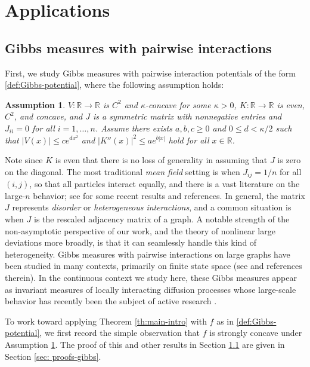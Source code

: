 \documentclass[11pt,reqno]{amsart}
\numberwithin{equation}{section}
\newtheorem{assumption}[theorem]{Assumption}
\theoremstyle{definition}
\def\R{{\mathbb R}}
\begin{document}
\section{Applications} \label{se:applications}

\subsection{Gibbs measures with pairwise interactions} \label{se:Gibbs}


First, we study Gibbs measures  with pairwise interaction potentials  of the form \eqref{def:Gibbs-potential},
	where the following assumption holds:
	\begin{assumption} \label{ass:Gibbs}
		$V : \R \to \R$ is $C^2$ and $\kappa$-concave for some $ \kappa > 0$, $K : \R \to \R$ is even, $C^2$, and concave, and $J$ is a symmetric matrix with nonnegative entries and $J_{ii}=0$ for all $i=1,\ldots,n$. Assume there exists $ a,b,c \ge 0 $ and $0 \le d  < \kappa/2$  such that $ |V(x)| \le  c e^{d x^2} $ and $|K''(x)|^2 \le ae^{b|x|}$  hold for all $ x \in \R $.
	\end{assumption}
	Note since $K$ is even that there is no loss of generality in assuming that $J$ is zero on the diagonal.
	The most traditional \emph{mean field} setting is when $J_{ij}=1/n$ for all $(i,j)$, so that all particles interact equally, and there is a vast literature on the large-$n$ behavior; see \cite{chafai2014first,dupuis2020large} for some recent results and references.
	In general, the matrix $J$ represents \emph{disorder} or \emph{heterogeneous interactions}, and a common situation is when $J$ is the rescaled adjacency matrix of a graph. A notable strength of the non-asymptotic perspective of our work, and the theory of nonlinear large deviations more broadly, is that it can seamlessly handle this kind of heterogeneity.
	Gibbs measures with pairwise interactions on large graphs have been studied in many contexts, primarily on finite state space (see \cite{basak-mukherjee,biskup2003rigorous,dembo2010ising,dembo2014replica} and references therein). In the continuous context we study here, these Gibbs measures appear as invariant measures of locally interacting diffusion processes whose large-scale behavior has recently been the subject of active research  \cite{delattre2016note,oliveira2019interacting}. 



To work toward applying Theorem \ref{th:main-intro} with $f$ as in \eqref{def:Gibbs-potential}, we first record the simple observation that $f$ is strongly concave under Assumption \ref{ass:Gibbs}. The proof of this and other results in Section \ref{se:Gibbs} are given in Section \ref{sec: proofs-gibbs}.
\end{document}
